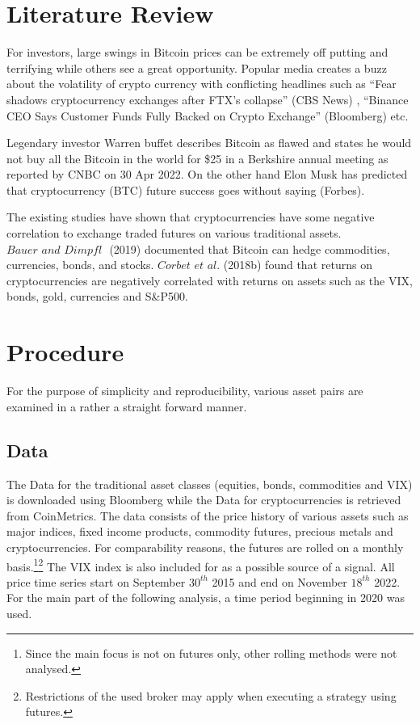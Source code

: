 \documentclass[11pt]{article}
\begin{document}
\newpage
\section{Literature Review}
For investors, large swings in Bitcoin prices can be extremely off putting and terrifying while others see a great opportunity. Popular media creates a buzz about the volatility of crypto currency with conflicting headlines such as “Fear shadows cryptocurrency exchanges after FTX's collapse” (CBS News) , “Binance CEO Says Customer Funds Fully Backed on Crypto Exchange” (Bloomberg) etc. 


Legendary investor Warren buffet describes Bitcoin as flawed and states he would not buy all the Bitcoin in the world for \$25 in a Berkshire annual meeting as reported by CNBC on 30 Apr 2022. On the other hand Elon Musk has predicted that cryptocurrency (BTC) future success goes without saying (Forbes).


The existing studies have shown that cryptocurrencies have some negative correlation to exchange traded futures on various traditional assets. 
$\textit{Bauer and Dimpfl }$ (2019) documented that Bitcoin can hedge commodities, currencies, bonds, and stocks. $\textit{Corbet et al.}$ (2018b) found that returns on cryptocurrencies are negatively correlated with returns on assets such as the VIX, bonds, gold, currencies and S&P500.


\clearpage
\section{Procedure} \label{sec:theory}
For the purpose of simplicity and reproducibility, various asset pairs are examined in a rather a straight forward manner.
\subsection{Data}
The Data for the traditional asset classes (equities, bonds, commodities and VIX) is downloaded using Bloomberg while the Data for cryptocurrencies is retrieved from CoinMetrics. The data consists of the price history of various assets such as major indices, fixed income products, commodity futures, precious metals and cryptocurrencies. For comparability reasons, the futures are rolled on a monthly basis.\footnote{Since the main focus is not on futures only, other rolling methods were not analysed.}\footnote{Restrictions of the used broker may apply when executing a strategy using futures.} The VIX index is also included for as a possible source of a signal.
All price time series start on September $30^{th}$ 2015 and end on November $18^{th}$ 2022. For the main part of the following analysis, a time period beginning in 2020 was used. 
\end{document}
